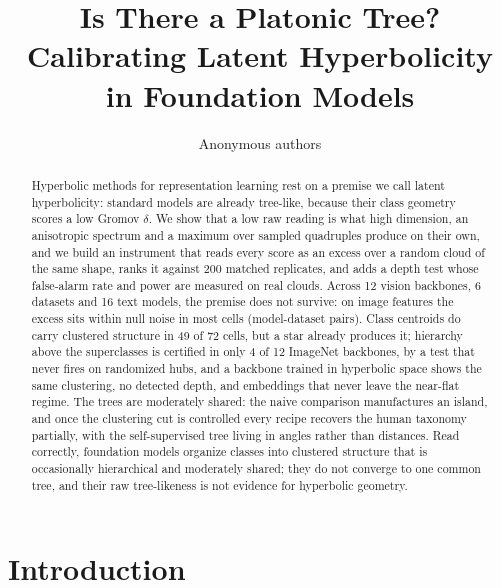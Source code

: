 \documentclass{article}
\title{Is There a Platonic Tree? \\ Calibrating Latent Hyperbolicity \\ in Foundation Models}
\author{Anonymous authors}
\theoremstyle{definition}
\theoremstyle{plain}
\theoremstyle{remark}
\begin{document}
\maketitle
\raggedbottom   %

\begin{abstract}
Hyperbolic methods for representation learning rest on a premise we call latent hyperbolicity: standard models are already tree-like, because their class geometry scores a low Gromov $\delta$. We show that a low raw reading is what high dimension, an anisotropic spectrum and a maximum over sampled quadruples produce on their own, and we build an instrument that reads every score as an excess over a random cloud of the same shape, ranks it against 200 matched replicates, and adds a depth test whose false-alarm rate and power are measured on real clouds. Across 12 vision backbones, 6 datasets and 16 text models, the premise does not survive: on image features the excess sits within null noise in most cells (model-dataset pairs). Class centroids do carry clustered structure in 49 of 72 cells, but a star already produces it; hierarchy above the superclasses is certified in only 4 of 12 ImageNet backbones, by a test that never fires on randomized hubs, and a backbone trained in hyperbolic space shows the same clustering, no detected depth, and embeddings that never leave the near-flat regime. The trees are moderately shared: the naive comparison manufactures an island, and once the clustering cut is controlled every recipe recovers the human taxonomy partially, with the self-supervised tree living in angles rather than distances. Read correctly, foundation models organize classes into clustered structure that is occasionally hierarchical and moderately shared; they do not converge to one common tree, and their raw tree-likeness is not evidence for hyperbolic geometry.
\end{abstract}

\section{Introduction}
\label{sec:introduction}
\end{document}
